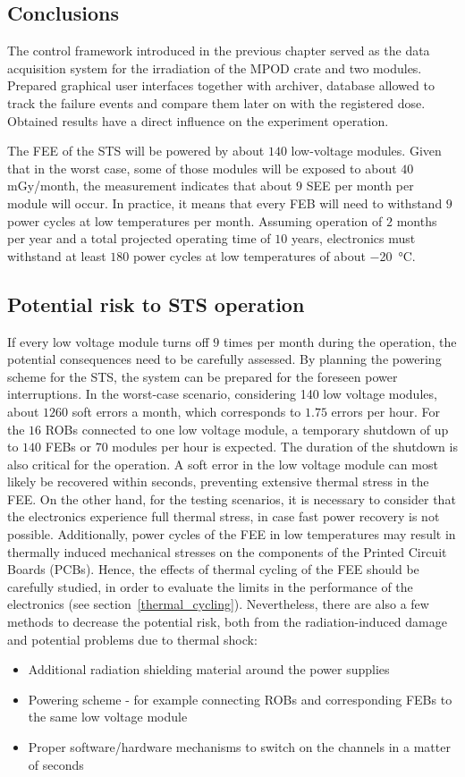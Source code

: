 \subsection{Conclusions}
\label{irradiation_results}
The control framework introduced in the previous chapter served as the data acquisition system for the irradiation of the MPOD crate and two modules. Prepared graphical user interfaces together with archiver, database allowed to track the failure events and compare them later on with the registered dose. Obtained results have a direct influence on the experiment operation.

The \gls{FEE} of the \gls{STS} will be powered by about $140$ low-voltage modules. Given that in the worst case, some of those modules will be exposed to about $40$\,mGy/month, the measurement indicates that about $9$ \gls{SEE} per month per module will occur. In practice, it means that every \gls{FEB} will need to withstand $9$ power cycles at low temperatures per month. Assuming operation of $2$ months per year and a total projected operating time of $10$ years, electronics must withstand at least $180$ power cycles at low temperatures of about \SI{-20}{\celsius}.
\subsection{Potential risk to STS operation}
If every low voltage module turns off $9$ times per month during the operation, the potential consequences need to be carefully assessed. By planning the powering scheme for the \gls{STS}, the system can be prepared for the foreseen power interruptions. In the worst-case scenario, considering 140 low voltage modules,  about $1260$ soft errors a month, which corresponds to $1.75$ errors per hour.  For the $16$ \glspl{ROB} connected to one low voltage module, a temporary shutdown of up to $140$ \glspl{FEB} or $70$ modules per hour is expected.  The duration of the shutdown is also critical for the operation. A soft error in the low voltage module can most likely be recovered within seconds, preventing extensive thermal stress in the \gls{FEE}. On the other hand, for the testing scenarios, it is necessary to consider that the electronics experience full thermal stress, in case fast power recovery is not possible. Additionally, power cycles of the \gls{FEE} in low temperatures may result in thermally induced mechanical stresses on the components of the Printed Circuit Boards (\glspl{PCB}). Hence, the effects of thermal cycling of the \gls{FEE} should be carefully studied, in order to evaluate the limits in the performance of the electronics  (see section~\ref{thermal_cycling}). Nevertheless, there are also a few methods to decrease the potential risk, both from the radiation-induced damage and potential problems due to thermal shock:
\begin{itemize}
    \item Additional radiation shielding material around the power supplies
    \item Powering scheme - for example connecting \glspl{ROB} and corresponding \glspl{FEB} to the same low voltage module
    \item Proper software/hardware mechanisms to switch on the channels in a matter of seconds
\end{itemize}
\newpage
